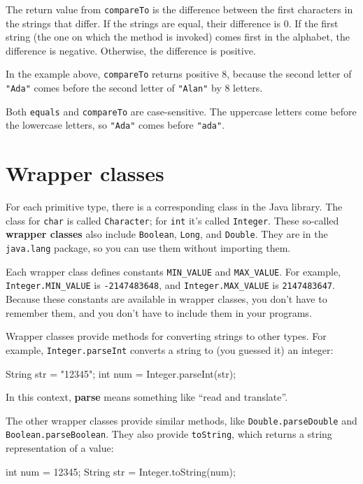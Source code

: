 \documentclass[12pt]{book}
\theoremstyle{exercise}
\newcommand{\java}[1]{\verb"#1"}
\begin{document}
The return value from \java{compareTo} is the difference between the first characters in the strings that differ.
If the strings are equal, their difference is 0.
If the first string (the one on which the method is invoked) comes first in the alphabet, the difference is negative.
Otherwise, the difference is positive.

In the example above, \java{compareTo} returns positive 8, because the second letter of \verb|"Ada"| comes before the second letter of \verb|"Alan"| by 8 letters.

Both \java{equals} and \java{compareTo} are case-sensitive.
The uppercase letters come before the lowercase letters, so \verb|"Ada"| comes before \verb|"ada"|.


\section{Wrapper classes}
\label{wrappers}

For each primitive type, there is a corresponding class in the Java library.
The class for \java{char} is called \java{Character}; for \java{int} it's called \java{Integer}.
These so-called {\bf wrapper classes} also include \java{Boolean}, \java{Long}, and \java{Double}.
They are in the \java{java.lang} package, so you can use them without importing them.

Each wrapper class defines constants \java{MIN_VALUE} and \java{MAX_VALUE}.
For example, \java{Integer.MIN_VALUE} is \java{-2147483648}, and \java{Integer.MAX_VALUE} is \java{2147483647}.
Because these constants are available in wrapper classes, you don't have to remember them, and you don't have to include them in your programs.

Wrapper classes provide methods for converting strings to other types.
For example, \java{Integer.parseInt} converts a string to (you guessed it) an integer:

\begin{code}
String str = "12345";
int num = Integer.parseInt(str);
\end{code}

In this context, {\bf parse} means something like ``read and translate''.

The other wrapper classes provide similar methods, like \java{Double.parseDouble} and \java{Boolean.parseBoolean}.
They also provide \java{toString}, which returns a string representation of a value:

\begin{code}
int num = 12345;
String str = Integer.toString(num);
\end{code}
\end{document}
